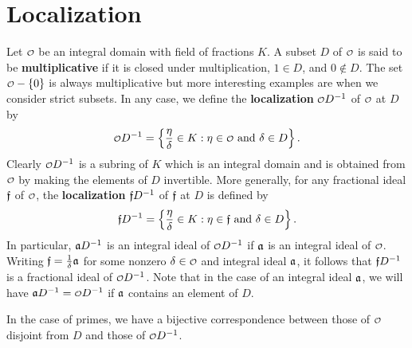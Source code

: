   \section{Localization}
    Let \(\smc{O}\) be an integral domain with field of fractions \(K\). A subset \(D\) of \(\smc{O}\) is said to be \textbf{multiplicative} if it is closed under multiplication, \(1 \in D\), and \(0 \notin D\). The set \(\smc{O}-\{0\}\) is always multiplicative but more interesting examples are when we consider strict subsets. In any case, we define the \textbf{localization} \(\smc{O}D^{-1}\) of \(\smc{O}\) at \(D\) by
    \[
      \smc{O}D^{-1} = \left\{\frac{\eta}{\d} \in K:\eta \in \smc{O} \text{ and } \d \in D\right\}.
    \]
    Clearly \(\smc{O}D^{-1}\) is a subring of \(K\) which is an integral domain and is obtained from \(\smc{O}\) by making the elements of \(D\) invertible. More generally, for any fractional ideal \(\mathfrak{f}\) of \(\smc{O}\), the \textbf{localization} \(\mathfrak{f}D^{-1}\) of \(\mathfrak{f}\) at \(D\) is defined by
    \[
      \mathfrak{f}D^{-1} = \left\{\frac{\eta}{\delta} \in K:\eta \in \mathfrak{f} \text{ and } \delta \in D\right\}.
    \]
    In particular, \(\mathfrak{a}D^{-1}\) is an integral ideal of \(\smc{O}D^{-1}\) if \(\mathfrak{a}\) is an integral ideal of \(\smc{O}\). Writing \(\mathfrak{f} = \frac{1}{\delta}\mathfrak{a}\) for some nonzero \(\d \in \smc{O}\) and integral ideal \(\mathfrak{a}\), it follows that \(\mathfrak{f}D^{-1}\) is a fractional ideal of \(\smc{O}D^{-1}\). Note that in the case of an integral ideal \(\mathfrak{a}\), we will have \(\mf{a}D^{-1} = \smc{O}D^{-1}\) if \(\mathfrak{a}\) contains an element of \(D\).
    
    In the case of primes, we have a bijective correspondence between those of \(\smc{O}\) disjoint from \(D\) and those of \(\smc{O}D^{-1}\).

